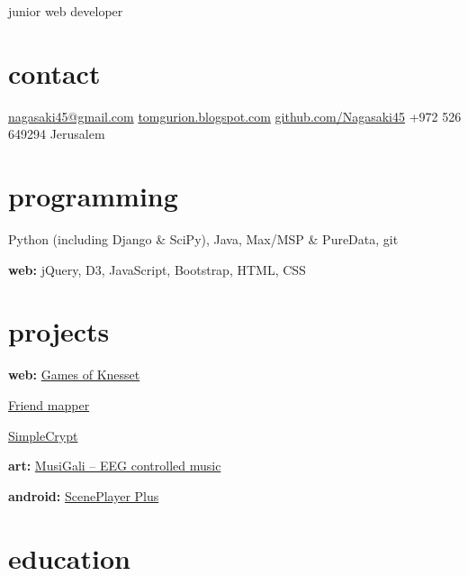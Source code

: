 \documentclass[]{friggeri-cv}  %
\begin{document}
       {junior web developer}


\begin{aside}
\section{contact}
\href{mailto:nagasaki45@gmail.com}{nagasaki45@gmail.com}
\href{http://tomgurion.blogspot.com}{tomgurion.blogspot.com}
\href{https://github.com/Nagasaki45}{github.com/Nagasaki45}
+972 526 649294
Jerusalem

\section{programming}
Python (including Django \& SciPy), Java, Max/MSP \& PureData, git

\textbf{web:}
jQuery, D3, JavaScript, Bootstrap, HTML, CSS

\section{projects}
\textbf{web:}
\href{http://www.games-of-knesset.com/}{Games of Knesset}

\href{http://friends-mapper.herokuapp.com/}{Friend mapper}

\href{http://simplecrypt.appspot.com/}{SimpleCrypt}

\textbf{art:}
\href{http://tomgurion.blogspot.co.il/2013/10/musigali-eeg-controlled-music-for-brain.html}{MusiGali -- EEG controlled music}

\textbf{android:}
\href{https://play.google.com/store/apps/details?id=com.nagasaki45.sceneplayerplus}{ScenePlayer Plus}

\end{aside}


\section{education}
\end{document}
